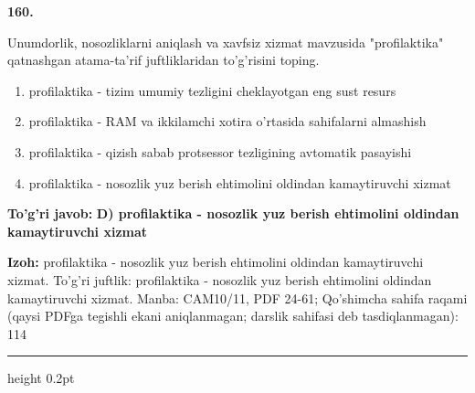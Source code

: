 \documentclass[10pt,a4paper]{article}
\begin{document}
{\bfseries\sffamily\color{ink} 160.}
\par
Unumdorlik, nosozliklarni aniqlash va xavfsiz xizmat mavzusida "profilaktika" qatnashgan atama-ta'rif juftliklaridan to'g'risini toping.
\begin{enumerate}[label=\Alph*),leftmargin=9mm]
\item profilaktika - tizim umumiy tezligini cheklayotgan eng sust resurs
\item profilaktika - RAM va ikkilamchi xotira o'rtasida sahifalarni almashish
\item profilaktika - qizish sabab protsessor tezligining avtomatik pasayishi
\item profilaktika - nosozlik yuz berish ehtimolini oldindan kamaytiruvchi xizmat
\end{enumerate}
\begin{tcolorbox}[enhanced,breakable,colback=teal!4,colframe=teal!60!black,boxrule=0.45pt,arc=1.2mm,left=2.7mm,right=2.7mm,top=1.8mm,bottom=1.8mm,before skip=2mm,after skip=2mm]
{\bfseries\sffamily\color{teal}To'g'ri javob:} \textbf{D) profilaktika - nosozlik yuz berish ehtimolini oldindan kamaytiruvchi xizmat}
\par\smallskip
{\bfseries Izoh:} profilaktika - nosozlik yuz berish ehtimolini oldindan kamaytiruvchi xizmat. To'g'ri juftlik: profilaktika - nosozlik yuz berish ehtimolini oldindan kamaytiruvchi xizmat. Manba: CAM10/11, PDF 24-61; Qo'shimcha sahifa raqami (qaysi PDFga tegishli ekani aniqlanmagan; darslik sahifasi deb tasdiqlanmagan): 114
\end{tcolorbox}
\vspace{2mm}\hrule height 0.2pt\vspace{3mm}
\end{document}
